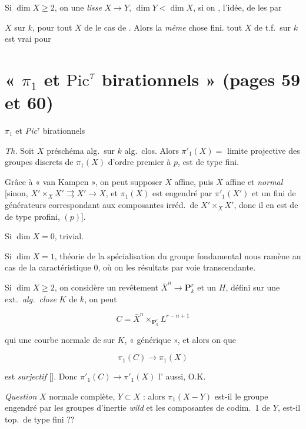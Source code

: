 \documentclass[11pt,a4paper]{article}
\begin{document}
Si $\dim X \geq 2$, on \ill{} une  \emph{lisse}
$X \to Y$, $\dim Y < \dim X$, \ill{} si on \ill{} \ill{}, l'idée, de \ill{}
les \ill{} par  \ill{}

 \ill{} $X$ \ill{} sur $k$, \ill{} pour tout \struck{\ill{}}
\ill{} $X$ de \ill{} le cas de \ill{}. Alors la \emph{même} chose \ill{} fini.
\ill{} \ill{} tout $X$ de t.f.\ sur $k$ \ill{} est vrai pour \ill{}

\section*{« $\pi_1$ et $\mathrm{Pic}^\tau$ birationnels » (pages 59 et 60)}

$\pi_1$ et \emph{Pic}$^\tau$ birationnels


\emph{Th.} Soit $X$ préschéma alg.\ sur $k$ alg.\ clos. Alors $\pi'_1(X) = $
limite projective des groupes  discrets de $\pi_1(X)$
d'ordre premier à $p$, \ill{} est \ill{} de type fini.

Grâce à « van Kampen », on peut supposer $X$ affine, puis $X$ affine et
\emph{normal} [sinon, \ill{}
$X' \times_X X' \rightrightarrows X' \to X$, et $\pi_1(X)$ est engendré par
$\pi'_1(X')$ et un \ill{} fini de générateurs correspondant aux composantes
irréd.\ de $X' \times_X X'$, donc il en est de \ill{} \ill{} de type profini,
\ill{} $(p)$].

Si $\dim X = 0$, trivial.

Si $\dim X = 1$, théorie de la spécialisation du groupe fondamental nous
ramène au cas de la caractéristique 0, où on \struck{\ill{}} \ill{} les
résultats par voie transcendante.

Si $\dim X \geq 2$, on considère un revêtement \ill{}
$\bar X^n \longrightarrow \mathbf{P}^r_k$ et un \ill{} \struck{\ill{}}
 $H$, défini sur une ext.\ \emph{alg.\
close} $K$ de $k$, on peut \ill{}

\[ C = \bar X^n \times_{\mathbf{P}^r_k} L^{r-n+1} \]

qui \ill{} une courbe normale de \ill{} sur $K$, \ill{} « générique », et
alors on \ill{} que

\[ \pi_1(C) \longrightarrow \pi_1(X) \]

est \emph{surjectif} [\ill{}]. Donc $\pi'_1(C) \to \pi'_1(X)$ l'\ill{} aussi,
O.K.

\emph{Question} $X$ normale complète, $Y \subset X$ \struck{\ill{}} : alors
$\pi_1(X - Y)$ est-il le \ill{} groupe \ill{} \ill{} engendré \ill{} par les
groupes d'inertie \emph{wild} \ill{} et les composantes de \ill{} codim.\ 1 de
$Y$, est-il \ill{} top.\ de type fini ??
\end{document}
